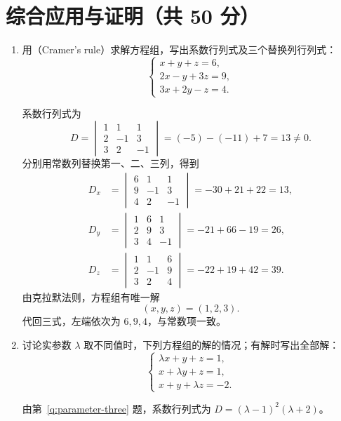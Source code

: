 \documentclass[UTF8,12pt,a4paper,fontset=fandol]{ctexart}
\begin{document}
\section{综合应用与证明（共 50 分）}
\begin{enumerate}[label=\arabic*.,resume=detquestions]

\item\label{q:cramer}
用（Cramer's rule）求解方程组，写出系数行列式及三个替换列行列式：
\[
\begin{cases}
x+y+z=6,\\
2x-y+3z=9,\\
3x+2y-z=4.
\end{cases}
\]
\begin{solve}
系数行列式为
\[
D=\begin{vmatrix}1&1&1\\2&-1&3\\3&2&-1\end{vmatrix}
=(-5)-(-11)+7=13\ne0.
\]
分别用常数列替换第一、二、三列，得到
\begin{align*}
D_x&=\begin{vmatrix}6&1&1\\9&-1&3\\4&2&-1\end{vmatrix}
=-30+21+22=13,\\
D_y&=\begin{vmatrix}1&6&1\\2&9&3\\3&4&-1\end{vmatrix}
=-21+66-19=26,\\
D_z&=\begin{vmatrix}1&1&6\\2&-1&9\\3&2&4\end{vmatrix}
=-22+19+42=39.
\end{align*}
由克拉默法则，方程组有唯一解
\[
\boxed{(x,y,z)=(1,2,3).}
\]
代回三式，左端依次为 $6,9,4$，与常数项一致。
\end{solve}

\item\label{q:parameter-system}
讨论实参数 $\lambda$ 取不同值时，下列方程组的解的情况；有解时写出全部解：
\[
\begin{cases}
\lambda x+y+z=1,\\
x+\lambda y+z=1,\\
x+y+\lambda z=-2.
\end{cases}
\]
\begin{solve}
由第~\ref{q:parameter-three} 题，系数行列式为
$D=(\lambda-1)^2(\lambda+2)$。


\end{solve}
\end{enumerate}
\end{document}
